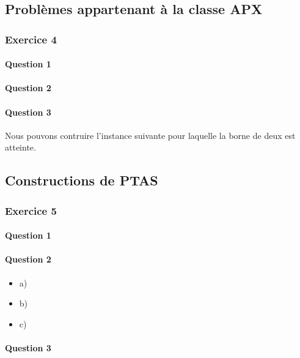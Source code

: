 \documentclass[a4paper, 12pt]{article}
\begin{document}
\subsection{Problèmes appartenant à la classe APX}

\subsubsection*{Exercice 4}

\paragraph{Question 1}

\paragraph{Question 2}

\paragraph{Question 3}

Nous pouvons contruire l'instance suivante pour laquelle la borne de
deux est atteinte.

\subsection{Constructions de PTAS}

\subsubsection*{Exercice 5}

\paragraph{Question 1}

\paragraph{Question 2}

\begin{itemize}
\item a)
\item b)
\item c)
\end{itemize}

\paragraph{Question 3}
\end{document}
